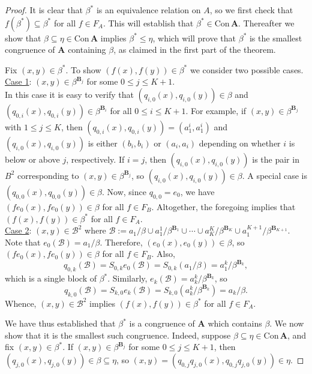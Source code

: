 \documentclass[cm,dissertation,actual,final]{uhthesis}
\theoremstyle{plain}
\theoremstyle{definition}
\newcounter{claim}
\theoremstyle{remark}
\numberwithin{theorem}{section}
\numberwithin{claim}{chapter}
\numberwithin{equation}{section}
\numberwithin{conjecture}{chapter}
\newcommand{\<}{\ensuremath{\langle}}
\renewcommand{\>}{\ensuremath{\rangle}}
\renewcommand{\leq}{\ensuremath{\leqslant}}
\newcommand{\Con}{\ensuremath{\mathrm{Con\,}}}
\newcommand{\0}{\ensuremath{\mathbf{0}}}
\newcommand{\1}{\ensuremath{\mathbf{1}}}
\newcommand{\2}{\ensuremath{\mathbf{2}}}
\newcommand{\3}{\ensuremath{\mathbf{3}}}
\newcommand{\4}{\ensuremath{\mathbf{4}}}
\newcommand{\5}{\ensuremath{\mathbf{5}}}
\newcommand{\bA}{\ensuremath{\mathbf{A}}}
\newcommand{\bB}{\ensuremath{\mathbf{B}}}
\newcommand{\sB}{\ensuremath{\mathscr{B}}}
\begin{document}
\begin{proof}
  It is clear that $\beta^*$ is an equivalence relation on $A$, so we first
  check that $f(\beta^*)\subseteq 
  \beta^*$ for all $f\in F_A$.  This will establish that $\beta^*\in \Con\bA$.
  Thereafter we show that $\beta \subseteq \eta \in \Con\bA$ implies 
  $\beta^*\leq \eta$, which will prove that $\beta^*$ is the smallest congruence
  of $\bA$ containing $\beta$, as claimed in the first part of the theorem.

  Fix $(x,y) \in \beta^*$.  To show $(f(x), f(y)) \in \beta^*$ we consider two
  possible cases.
  \\[6pt]
  \underline{Case 1}: $(x,y)\in \beta^{\bB_j}$ for some $0\leq j \leq K+1$.\\[4pt]
  In this case it is easy to verify that $(q_{i,0}(x), q_{i,0}(y)) \in \beta$ and 
  $(q_{0,i}(x), q_{0,i}(y)) \in \beta^{\bB_i}$  for all $0\leq i \leq
  K+1$.  For example, if $(x,y)\in \beta^{\bB_j}$ with $1\leq j \leq K$, 
  then $(q_{0,i}(x), q_{0,i}(y))  = (a_1^i, a_1^i)$ %
  and $(q_{i,0}(x), q_{i,0}(y))$ is either $(b_i, b_i)$ or $(a_i,
  a_i)$ depending on whether $i$ is below or above $j$, respectively. If $i=j$,
  then $(q_{i,0}(x), q_{i,0}(y))$ is the pair in $B^2$ corresponding to
  $(x,y)\in \beta^{\bB_j}$, so $(q_{i,0}(x), q_{i,0}(y))\in \beta$.
  A special case is $(q_{0,0}(x), q_{0,0}(y)) \in \beta$.  Now, since 
  $q_{0,0} = e_0$, we have $(f e_{0}(x), f e_{0}(y))\in \beta$
  for all $f\in F_B$.
  Altogether, the foregoing implies that $(f(x),f(y))\in \beta^*$
  for all $f\in F_A$.
  \\[6pt]
  \underline{Case 2}: $(x,y)\in \sB^2$ where 
  $\sB := a_1/\beta \cup a_1^1/\beta^{\bB_1} \cup \cdots \cup a_K^K/\beta^{\bB_K}\cup a_1^{K+1}/\beta^{\bB_{K+1}}$.
  \\[4pt]
  Note that  $e_0(\sB) = a_1/\beta$. Therefore, 
  $(e_0(x),e_0(y)) \in  \beta$, so 
  $(fe_0(x),fe_0(y)) \in  \beta$ for all $f\in F_B$.  Also,
  \[
  q_{0,k}(\sB) = S_{0,k} e_0(\sB) = S_{0,k}(a_1/\beta) = 
  a_1^{k}/\beta^{\bB_{k}},
  \]
  which is a single block of $\beta^*$.
  Similarly,
  $e_k(\sB) = a_k^k/\beta^{\bB_k}$, so 
  \[
  q_{k,0}(\sB) = S_{k,0} e_k(\sB) = S_{k,0}(a_k^k/\beta^{\bB_k}) = a_k/\beta.
  \]
  Whence, $(x,y)\in \sB^2$ implies $(f(x), f(y)) \in \beta^*$ for all $f\in F_A$.

  We have thus established that $\beta^*$ is a congruence of $\bA$ which
  contains $\beta$.  We now show that it is the smallest such congruence.  Indeed,
  suppose $\beta \subseteq \eta \in \Con\bA$, and fix $(x,y)\in \beta^*$.
  If $(x,y)\in \beta^{\bB_j}$ for some $0\leq j \leq K+1$, then 
  $(q_{j,0}(x), q_{j,0}(y))\in \beta \subseteq \eta$, so 
  $(x, y) = (q_{0,j}q_{j,0}(x), q_{0,j}q_{j,0}(y))\in \eta$.


\end{proof}
\end{document}
